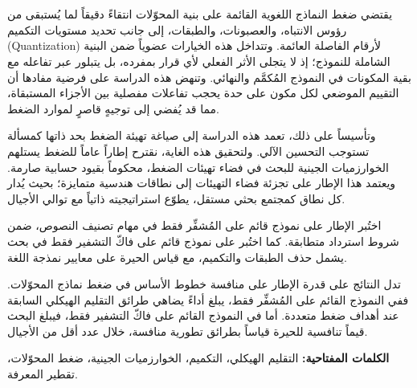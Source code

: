 	\chapter*{\ArabicSummaryHeading}
	\markboth{\ArabicSummaryHeading}{\ArabicSummaryHeading}
\else
	\begin{otherlanguage}{arabic}
	\chapter*{\ArabicSummaryHeading}
	\markboth{\ArabicSummaryHeading}{\ArabicSummaryHeading}

يقتضي ضغط النماذج اللغوية القائمة على بنية المحوّلات انتقاءً دقيقاً لما يُستبقى من رؤوس الانتباه، والعصبونات، والطبقات، إلى جانب تحديد مستويات التكميم (Quantization) لأرقام الفاصلة العائمة. وتتداخل هذه الخيارات عضوياً ضمن البنية الشاملة للنموذج؛ إذ لا يتجلى الأثر الفعلي لأي قرار بمفرده، بل يتبلور عبر تفاعله مع بقية المكونات في النموذج المُكمَّم والنهائي. وتنهض هذه الدراسة على فرضية مفادها أن التقييم الموضعي لكل مكون على حدة يحجب تفاعلات مفصلية بين الأجزاء المستبقاة، مما قد يُفضي إلى توجيهٍ قاصرٍ لموارد الضغط.

وتأسيساً على ذلك، تعمد هذه الدراسة إلى صياغة تهيئة الضغط بحد ذاتها كمسألة تستوجب التحسين الآلي. ولتحقيق هذه الغاية، نقترح إطاراً عاماً للضغط يستلهم الخوارزميات الجينية للبحث في فضاء تهيئات الضغط، محكوماً بقيود حسابية صارمة. ويعتمد هذا الإطار على تجزئة فضاء التهيئات إلى نطاقات هندسية متمايزة؛ بحيث يُدار كل نطاق كمجتمع بحثي مستقل، يطوّع استراتيجيته ذاتياً مع توالي الأجيال.

اختُبر الإطار على نموذج قائم على المُشفِّر فقط في مهام تصنيف النصوص، ضمن شروط استرداد متطابقة. كما اختُبر على نموذج قائم على فاكّ التشفير فقط في بحث يشمل حذف الطبقات والتكميم، مع قياس الحيرة على معايير نمذجة اللغة.

تدل النتائج على قدرة الإطار على منافسة خطوط الأساس في ضغط نماذج المحوّلات. ففي النموذج القائم على المُشفِّر فقط، يبلغ أداءً يضاهي طرائق التقليم الهيكلي السابقة عند أهداف ضغط متعددة. أما في النموذج القائم على فاكّ التشفير فقط، فيبلغ البحث قيماً تنافسية للحيرة قياساً بطرائق تطورية منافسة، خلال عدد أقل من الأجيال.

\vspace{1em}
\noindent\textbf{الكلمات المفتاحية:} التقليم الهيكلي، التكميم، الخوارزميات الجينية، ضغط المحوّلات، تقطير المعرفة.

	\end{otherlanguage}
\fi

\clearpage
